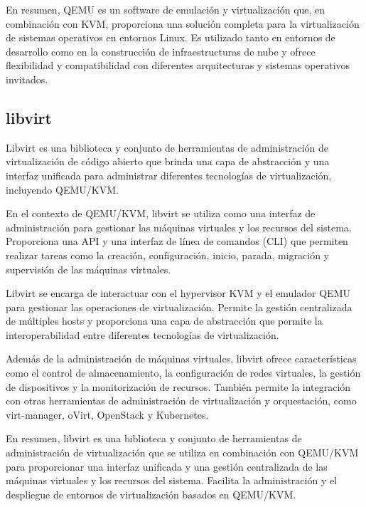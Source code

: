 				En resumen, QEMU es un software de emulación y virtualización que, en combinación con KVM, proporciona una solución completa para la virtualización de sistemas operativos en entornos Linux. Es utilizado tanto en entornos de desarrollo como en la construcción de infraestructuras de nube y ofrece flexibilidad y compatibilidad con diferentes arquitecturas y sistemas operativos invitados.\par
				
				
			\subsection{libvirt} 
		
				Libvirt es una biblioteca y conjunto de herramientas de administración de virtualización de código abierto que brinda una capa de abstracción y una interfaz unificada para administrar diferentes tecnologías de virtualización, incluyendo QEMU/KVM.\par
		
				En el contexto de QEMU/KVM, libvirt se utiliza como una interfaz de administración para gestionar las máquinas virtuales y los recursos del sistema. Proporciona una API y una interfaz de línea de comandos (CLI) que permiten realizar tareas como la creación, configuración, inicio, parada, migración y supervisión de las máquinas virtuales.\par
		
				Libvirt se encarga de interactuar con el hypervisor KVM y el emulador QEMU para gestionar las operaciones de virtualización. Permite la gestión centralizada de múltiples hosts y proporciona una capa de abstracción que permite la interoperabilidad entre diferentes tecnologías de virtualización.\par
		
				Además de la administración de máquinas virtuales, libvirt ofrece características como el control de almacenamiento, la configuración de redes virtuales, la gestión de dispositivos y la monitorización de recursos. También permite la integración con otras herramientas de administración de virtualización y orquestación, como virt-manager, oVirt, OpenStack y Kubernetes.\par
		
				En resumen, libvirt es una biblioteca y conjunto de herramientas de administración de virtualización que se utiliza en combinación con QEMU/KVM para proporcionar una interfaz unificada y una gestión centralizada de las máquinas virtuales y los recursos del sistema. Facilita la administración y el despliegue de entornos de virtualización basados en QEMU/KVM.\par
				
